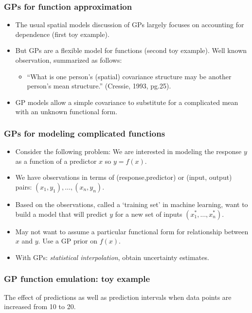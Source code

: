 \documentclass{beamer}
\begin{document}
\begin{frame}
\frametitle{GPs for  function approximation  }
\begin{itemize}
\item The usual spatial models discussion of GPs largely 
  focuses on accounting for dependence  (first toy example).
\item But GPs are a flexible model for functions (second toy
  example).  Well known observation, summarized as follows:
\begin{itemize}
\item ``What is one person's (spatial) covariance structure may be another
person's mean structure.'' (Cressie, 1993, pg.25).
\end{itemize}
\item GP models allow a simple covariance to substitute for a complicated
mean with an unknown functional form.
\end{itemize}

\end{frame}

\begin{frame}
\frametitle{GPs for modeling complicated functions }
\begin{itemize}
\item Consider the following problem: We are
  interested in modeling the response $y$ as a function of a predictor
  $x$ so $y=f(x)$.%
\item We have observations in terms of 
  (response,predictor) or (input, output) pairs:
  $(x_1,y_1),\dots,(x_n,y_n)$. 
\item Based on the observations, called a `training set' in machine
  learning, want to build a model that will predict $y$ for a new set
  of inputs $(x^*_1,\dots,x^*_n)$.
\item May not want to assume a particular functional form for
  relationship between $x$ and $y$. Use a GP prior on $f(x)$.
\item With GPs: {\it statistical interpolation}, obtain uncertainty estimates.
\end{itemize}
\end{frame}


\begin{frame}
  \frametitle{GP function emulation: toy example }
\begin{figure}
 \end{figure}
The effect of predictions as well as prediction intervals when data
points are increased from 10 to 20.
\end{frame}
\end{document}
